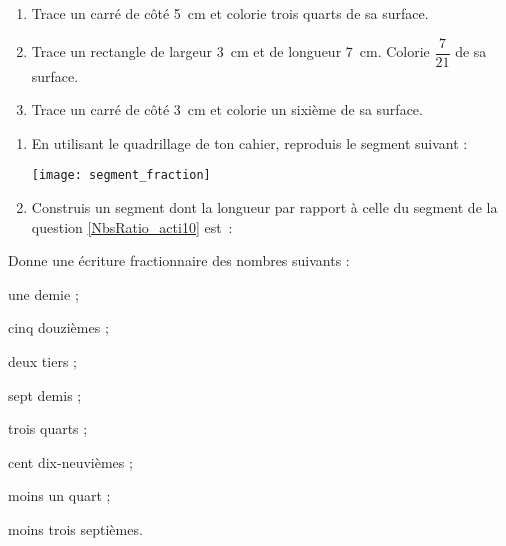 \begin{exercice}
\begin{enumerate}
  \item Trace un carré de côté 5 cm et colorie trois quarts de sa surface.
  \item Trace un rectangle de largeur 3 cm et de longueur 7 cm. Colorie $\dfrac{7}{21}$ de sa surface.
  \item Trace un carré de côté 3 cm et colorie un sixième de sa surface.
 \end{enumerate}
\end{exercice}


\begin{exercice}
\begin{enumerate}
 \item En utilisant le quadrillage de ton cahier, reproduis le segment suivant : \label{NbsRatio_acti10}
 
\texttt{[image: segment\_fraction]}
 \item Construis un segment dont la longueur par rapport à celle du segment de la question \ref{NbsRatio_acti10} est :
 \end{enumerate}
\end{exercice}



\begin{exercice}
Donne une écriture fractionnaire des nombres suivants :
\begin{colenumerate}{2}
 \item une demie ;
 \item cinq douzièmes ;
 \item deux tiers ;
 \item sept demis ;
 \item trois quarts ;
 \item cent dix-neuvièmes ;
 \item moins un quart ;
 \item moins trois septièmes.
 \end{colenumerate}
\end{exercice}


